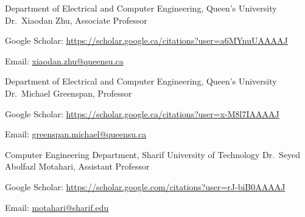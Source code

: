 

\begin{cventries}

  \cventry
    {Department of Electrical and Computer Engineering, Queen's University} %
    {Dr.~Xiaodan Zhu, Associate Professor} %
    {} %
    {} %
    {
      \begin{cvitems} %
        \item {Google Scholar: \href{https://scholar.google.ca/citations?user=a6MYnuUAAAAJ&hl=en}{https://scholar.google.ca/citations?user=a6MYnuUAAAAJ}}
        \item {Email: \href{mailto:xiaodan.zhu@queensu.ca}{xiaodan.zhu@queensu.ca}}
      \end{cvitems}
    }

  \cventry
    {Department of Electrical and Computer Engineering, Queen's University} %
    {Dr.~Michael Greenspan, Professor} %
    {} %
    {} %
    {
      \begin{cvitems} %
        \item {Google Scholar: \href{https://scholar.google.ca/citations?user=x-M8l7IAAAAJ&hl=en}{https://scholar.google.ca/citations?user=x-M8l7IAAAAJ}}
        \item {Email: \href{mailto:greenspan.michael@queensu.ca}{greenspan.michael@queensu.ca}}
      \end{cvitems}
    }

  \cventry
    {Computer Engineering Department, Sharif University of Technology} %
    {Dr.~Seyed Abolfazl Motahari, Assistant Professor} %
    {} %
    {} %
    {
      \begin{cvitems} %
        \item {Google Scholar: \href{https://scholar.google.com/citations?user=rJ-biB0AAAAJ&hl=en}{https://scholar.google.com/citations?user=rJ-biB0AAAAJ}}
        \item {Email: \href{mailto:motahari@sharif.edu}{motahari@sharif.edu}}
      \end{cvitems}
    }



\end{cventries}
